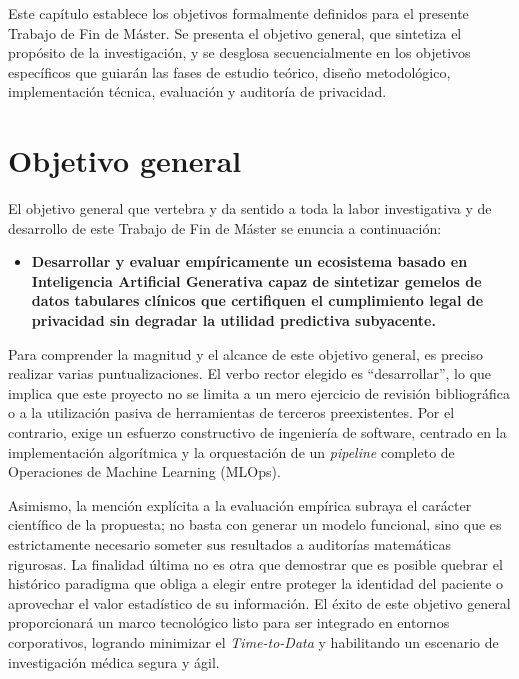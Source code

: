 
Este capítulo establece los objetivos formalmente definidos para el presente Trabajo de Fin de Máster. Se presenta el objetivo general, que sintetiza el propósito de la investigación, y se desglosa secuencialmente en los objetivos específicos que guiarán las fases de estudio teórico, diseño metodológico, implementación técnica, evaluación y auditoría de privacidad.

\setcounter{section}{0}
\section{Objetivo general}

El objetivo general que vertebra y da sentido a toda la labor investigativa y de desarrollo de este Trabajo de Fin de Máster se enuncia a continuación:

\begin{itemize}
  \item \textbf{Desarrollar y evaluar empíricamente un ecosistema basado en Inteligencia Artificial Generativa capaz de sintetizar gemelos de datos tabulares clínicos que certifiquen el cumplimiento legal de privacidad sin degradar la utilidad predictiva subyacente.}
\end{itemize}

Para comprender la magnitud y el alcance de este objetivo general, es preciso realizar varias puntualizaciones. El verbo rector elegido es ``desarrollar'', lo que implica que este proyecto no se limita a un mero ejercicio de revisión bibliográfica o a la utilización pasiva de herramientas de terceros preexistentes. Por el contrario, exige un esfuerzo constructivo de ingeniería de software, centrado en la implementación algorítmica y la orquestación de un \textit{pipeline} completo de Operaciones de Machine Learning (MLOps). 

Asimismo, la mención explícita a la evaluación empírica subraya el carácter científico de la propuesta; no basta con generar un modelo funcional, sino que es estrictamente necesario someter sus resultados a auditorías matemáticas rigurosas. La finalidad última no es otra que demostrar que es posible quebrar el histórico paradigma que obliga a elegir entre proteger la identidad del paciente o aprovechar el valor estadístico de su información. El éxito de este objetivo general proporcionará un marco tecnológico listo para ser integrado en entornos corporativos, logrando minimizar el \textit{Time-to-Data} y habilitando un escenario de investigación médica segura y ágil.

